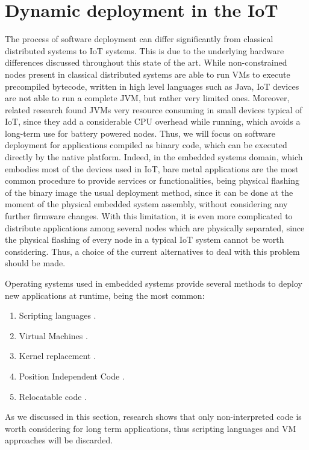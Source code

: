 \section{Dynamic deployment in the IoT}
The process of software deployment can differ significantly from classical distributed systems to IoT systems.
This is due to the underlying hardware differences discussed throughout this state of the art.
While non-constrained nodes present in classical distributed systems are able to run VMs to execute precompiled bytecode, written in high level languages such as Java, IoT devices are not able to run a complete JVM, but rather very limited ones\cite{levis2002mate}\cite{brouwers2009darjeeling}.
Moreover, related research\cite{oliver2014reprogramming} found JVMs very resource consuming in small devices typical of IoT, since they add a considerable CPU overhead while running, which avoids a long-term use for battery powered nodes.
Thus, we will focus on software deployment for applications compiled as binary code, which can be executed directly by the native platform.
Indeed, in the embedded systems domain, which embodies most of the devices used in IoT, bare metal applications are the most common procedure to provide services or functionalities, being physical flashing of the binary image the usual deployment method, since it can be done at the moment of the physical embedded system assembly, without considering any further firmware changes.
With this limitation, it is even more complicated to distribute applications among several nodes which are physically separated, since the physical flashing of every node in a typical IoT system cannot be worth considering.
Thus, a choice of the current alternatives to deal with this problem should be made.

Operating systems used in embedded systems provide several methods to deploy new applications at runtime, being the most common:
\begin{enumerate}
	\item Scripting languages \cite{dunkels2006low}\cite{kovatsch2012actinium}.
	\item Virtual Machines \cite{levis2002mate}\cite{brouwers2009darjeeling}.
	\item Kernel replacement \cite{hui2004dynamic}.
	\item Position Independent Code \cite{han2005dynamic} \cite{chen2010enix}.
	\item Relocatable code \cite{david2005wildcat}\cite{dong2009dynamic}\cite{dunkels2004contiki}.
\end{enumerate}
As we discussed in this section, research shows that only non-interpreted code is worth considering for long term applications, thus scripting languages and VM approaches will be discarded.


